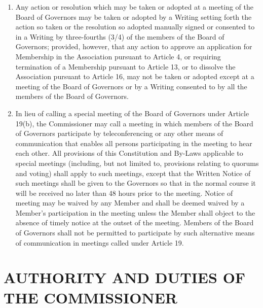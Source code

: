 \documentclass[]{book}
\providecommand{\tightlist}{%
  \setlength{\itemsep}{0pt}\setlength{\parskip}{0pt}}
\begin{document}
\begin{enumerate}
\def\labelenumi{(\alph{enumi})}
\tightlist
\item
  Any action or resolution which may be taken or adopted at a meeting of the Board of Governors may be taken or adopted by a Writing setting forth the action so taken or the resolution so adopted manually signed or consented to in a Writing by three-fourths (3/4) of the members of the Board of Governors; provided, however, that any action to approve an application for Membership in the Association pursuant to Article 4, or requiring termination of a Membership pursuant to Article 13, or to dissolve the Association pursuant to Article 16, may not be taken or adopted except at a meeting of the Board of Governors or by a Writing consented to by all the members of the Board of Governors.
\item
  In lieu of calling a special meeting of the Board of Governors under Article 19(b), the Commissioner may call a meeting in which members of the Board of Governors participate by teleconferencing or any other means of communication that enables all persons participating in the meeting to hear each other. All provisions of this Constitution and By-Laws applicable to special meetings (including, but not limited to, provisions relating to quorums and voting) shall apply to such meetings, except that the Written Notice of such meetings shall be given to the Governors so that in the normal course it will be received no later than 48 hours prior to the meeting. Notice of meeting may be waived by any Member and shall be deemed waived by a Member's participation in the meeting unless the Member shall object to the absence of timely notice at the outset of the meeting. Members of the Board of Governors shall not be permitted to participate by such alternative means of communication in meetings called under Article 19.
\end{enumerate}

\hypertarget{authority-and-duties-of-the-commissioner}{%
\section{AUTHORITY AND DUTIES OF THE COMMISSIONER}\label{authority-and-duties-of-the-commissioner}}
\end{document}
